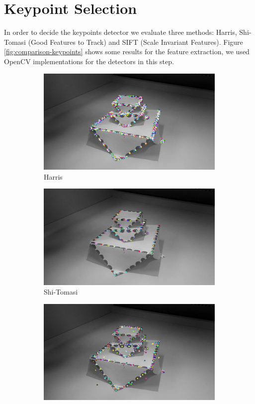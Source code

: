 \section{Keypoint Selection}

In order to decide the keypoints detector we evaluate three methods: Harris, Shi-Tomasi (Good Features to Track) and SIFT (Scale Invariant Features). Figure \ref{fig:comparison-keypoints} shows some results for the feature extraction, we used OpenCV implementations for the detectors in this step.

\begin{figure}[!h]
	\centering
	\begin{subfigure}{0.5\textwidth}
	  \centering
	  \includegraphics[width=0.9\linewidth]{figs/kpts-Harris.jpg}
	  \caption{Harris}
	\end{subfigure}%
	\begin{subfigure}{0.5\textwidth}
	  \centering
	  \includegraphics[width=0.9\linewidth]{figs/kpts_Shitomosi.jpg}
	  \caption{Shi-Tomasi}
	\end{subfigure}
	\begin{subfigure}{0.5\textwidth}
        \centering
        \includegraphics[width=0.9\linewidth]{figs/kpts_Sift.jpg}

\end{subfigure}
\end{figure}
